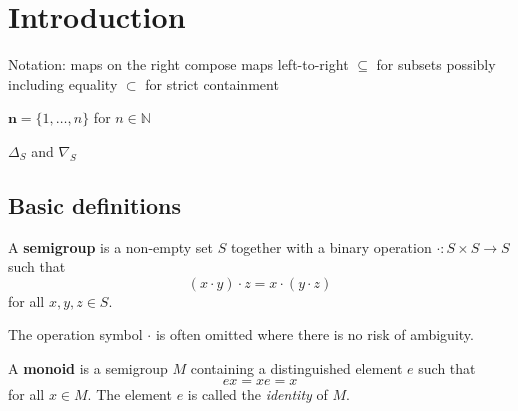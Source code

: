 \chapter{Introduction}
\label{chap:intro}


Notation:
maps on the right
compose maps left-to-right
$\subseteq$ for subsets possibly including equality
$\subset$ for strict containment

$\mathbf{n} = \{1, \ldots, n\}$ for $n \in \mathbb{N}$

$\Delta_S$ and $\nabla_S$

\section{Basic definitions}
\label{sec:intro-basic}

\begin{definition}
  \label{def:semigroup}
  A \textbf{semigroup} is a non-empty set $S$ together with
  a binary operation $\cdot: S \times S \to S$ such that
  $$(x \cdot y) \cdot z = x \cdot (y \cdot z)$$
  for all $x, y, z \in S$.
\end{definition}
The operation symbol $\cdot$ is often omitted where there is no risk of ambiguity.

\begin{definition}
  \label{def:monoid}
  A \textbf{monoid} is a semigroup $M$ containing a distinguished element $e$
  such that
  $$ex = xe = x$$
  for all $x \in M$.  The element $e$ is called the \textit{identity} of $M$.
\end{definition}

